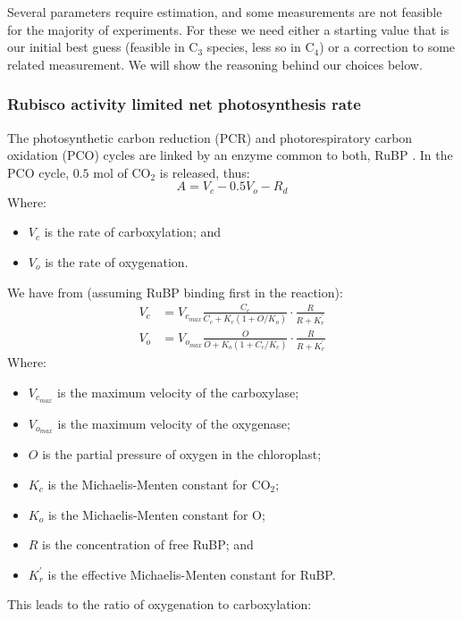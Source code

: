 \documentclass[11pt]{article} %
\begin{document}
Several parameters require estimation, and some measurements are not feasible for the majority of experiments. For these we need either a starting value that is our initial best guess (feasible in C$_3$ species, less so in C$_4$) or a correction to some related measurement. We will  show the reasoning behind our choices below.

\subsubsection{Rubisco activity limited net photosynthesis rate}
The photosynthetic carbon reduction (PCR) and photorespiratory carbon oxidation (PCO) cycles are linked by an enzyme common to both, RuBP \cite{Farquharbiochemicalmodelphotosynthetic1980}. In the PCO cycle, $0.5$ mol of CO$_2$ is released, thus:
\begin{equation} \label{net_assimilation_raw}
A = V_c - 0.5 V_o - R_d
\end{equation}
Where:
\begin{itemize}
 \item $V_c$ is the rate of carboxylation; and
 \item $V_o$ is the rate of oxygenation.
\end{itemize}
We have from \citet{FarquharModelsdescribingkinetics1979} (assuming RuBP binding first in the reaction):
\begin{align} \label{V_c}
V_c &= V_{c_{max}}\frac{C_c}{C_c+K_c\left(1 + O/K_o\right)}\cdot\frac{R}{R + K^\prime_r} \\
V_o &= V_{o_{max}}\frac{O}{O+K_o\left(1 + C_c/K_c\right)}\cdot\frac{R}{R + K^\prime_r}
\end{align}
Where:
\begin{itemize}
 \item $V_{c_{max}}$ is the maximum velocity of the carboxylase;
 \item $V_{o_{max}}$ is the maximum velocity of the oxygenase;
 \item $O$ is the partial pressure of oxygen in the chloroplast;
 \item $K_c$ is the Michaelis-Menten constant for CO$_2$;
 \item $K_o$ is the Michaelis-Menten constant for O;
 \item $R$ is the concentration of free RuBP; and
 \item $K^\prime_r$ is the effective Michaelis-Menten constant for RuBP.
\end{itemize}
This leads to the ratio of oxygenation to carboxylation:
\end{document}

